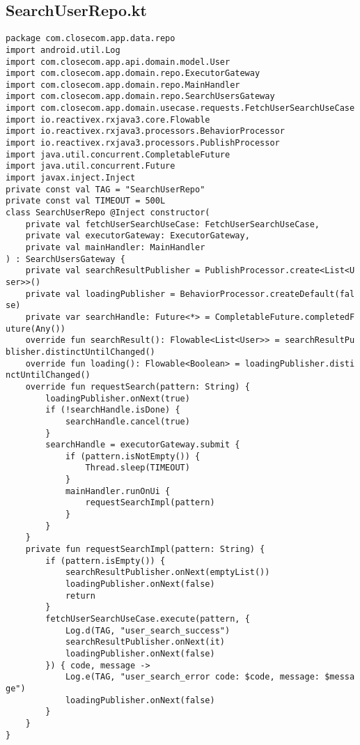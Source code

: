 \documentclass[listing]{espd}
\begin{document}
\subsection{SearchUserRepo.kt}
\begin{verbatim}
package com.closecom.app.data.repo
import android.util.Log
import com.closecom.app.api.domain.model.User
import com.closecom.app.domain.repo.ExecutorGateway
import com.closecom.app.domain.repo.MainHandler
import com.closecom.app.domain.repo.SearchUsersGateway
import com.closecom.app.domain.usecase.requests.FetchUserSearchUseCase
import io.reactivex.rxjava3.core.Flowable
import io.reactivex.rxjava3.processors.BehaviorProcessor
import io.reactivex.rxjava3.processors.PublishProcessor
import java.util.concurrent.CompletableFuture
import java.util.concurrent.Future
import javax.inject.Inject
private const val TAG = "SearchUserRepo"
private const val TIMEOUT = 500L
class SearchUserRepo @Inject constructor(
    private val fetchUserSearchUseCase: FetchUserSearchUseCase,
    private val executorGateway: ExecutorGateway,
    private val mainHandler: MainHandler
) : SearchUsersGateway {
    private val searchResultPublisher = PublishProcessor.create<List<U
ser>>()
    private val loadingPublisher = BehaviorProcessor.createDefault(fal
se)
    private var searchHandle: Future<*> = CompletableFuture.completedF
uture(Any())
    override fun searchResult(): Flowable<List<User>> = searchResultPu
blisher.distinctUntilChanged()
    override fun loading(): Flowable<Boolean> = loadingPublisher.disti
nctUntilChanged()
    override fun requestSearch(pattern: String) {
        loadingPublisher.onNext(true)
        if (!searchHandle.isDone) {
            searchHandle.cancel(true)
        }
        searchHandle = executorGateway.submit {
            if (pattern.isNotEmpty()) {
                Thread.sleep(TIMEOUT)
            }
            mainHandler.runOnUi {
                requestSearchImpl(pattern)
            }
        }
    }
    private fun requestSearchImpl(pattern: String) {
        if (pattern.isEmpty()) {
            searchResultPublisher.onNext(emptyList())
            loadingPublisher.onNext(false)
            return
        }
        fetchUserSearchUseCase.execute(pattern, {
            Log.d(TAG, "user_search_success")
            searchResultPublisher.onNext(it)
            loadingPublisher.onNext(false)
        }) { code, message ->
            Log.e(TAG, "user_search_error code: $code, message: $messa
ge")
            loadingPublisher.onNext(false)
        }
    }
}
\end{verbatim}
\end{document}
